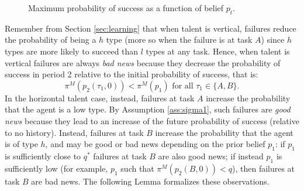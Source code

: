 \documentclass[12pt,american]{paper}
\theoremstyle{remark}
\begin{document}
\begin{figure}[h!]
    \centering
    \centering
  \caption{Maximum probability of success as a function of belief $p_t$.}
  \label{fig: success 2}
\end{figure}
%
Remember from Section \ref{sec:learning} that when talent is vertical, failures reduce the probability of being a $h$ type (more so when the failure is at task $A$) since $h$ types are more likely to succeed than $l$ types at any task. Hence, when talent is vertical failures are always \textit{bad news} because they decrease the probability of success in period 2 relative to the initial probability of success, that is:
\[
\pi^M(p_2(\tau_1,0))<\pi^M(p_1) \mbox{ for all } \tau_1\in \{A,B\}.
\]
In the horizontal talent case, instead, failures at task $A$ increase the probability that the agent is a low type. By Assumption \ref{ass:sigma1}, such failures are \textit{good news } because they lead to an increase of the future probability of success (relative to no history). Instead, failures at task $B$ increase the probability that the agent is of type $h$, and may be good or bad news depending on the prior belief $p_1$: if $p_1$ is sufficiently close to $q^*$ failures at task $B$ are also good news; if instead $p_1$ is sufficiently low (for example, $p_1$ such that $\pi^M(p_2(B,0))<q$), then failures at task $B$ are bad news. The following Lemma formalizes these observations.
\end{document}
